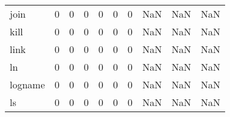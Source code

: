 \begin{longtable}{lrrrrrrrrr}
join      &                                       0 &                                                  0 &                                                  0 &                                                  0 &                                                  0 &                                                  0 &                                                NaN &                                    NaN &                                  NaN \\
kill      &                                       0 &                                                  0 &                                                  0 &                                                  0 &                                                  0 &                                                  0 &                                                NaN &                                    NaN &                                  NaN \\
link      &                                       0 &                                                  0 &                                                  0 &                                                  0 &                                                  0 &                                                  0 &                                                NaN &                                    NaN &                                  NaN \\
ln        &                                       0 &                                                  0 &                                                  0 &                                                  0 &                                                  0 &                                                  0 &                                                NaN &                                    NaN &                                  NaN \\
logname   &                                       0 &                                                  0 &                                                  0 &                                                  0 &                                                  0 &                                                  0 &                                                NaN &                                    NaN &                                  NaN \\
ls        &                                       0 &                                                  0 &                                                  0 &                                                  0 &                                                  0 &                                                  0 &                                                NaN &                                    NaN &                                  NaN \\

\end{longtable}
